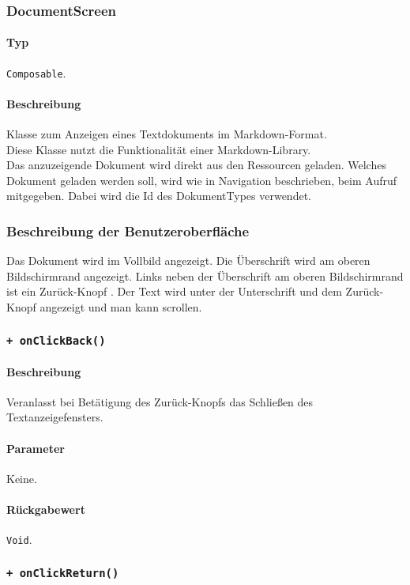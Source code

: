 \subsubsection{DocumentScreen}
\paragraph*{Typ}
\texttt{Composable}.
\paragraph*{Beschreibung}
Klasse zum Anzeigen eines Textdokuments im Markdown-Format.\\
Diese Klasse nutzt die Funktionalität einer Markdown-Library.\\
Das anzuzeigende Dokument wird direkt aus den Ressourcen geladen.
Welches Dokument geladen werden soll, wird wie in Navigation beschrieben, beim Aufruf mitgegeben. 
Dabei wird die Id des DokumentTypes verwendet.

\subsubsection*{Beschreibung der Benutzeroberfläche}
Das Dokument wird im Vollbild angezeigt.
Die Überschrift wird am oberen Bildschirmrand angezeigt.
Links neben der Überschrift am oberen Bildschirmrand ist ein \dq Zurück-Knopf \dq{}.
Der Text wird unter der Unterschrift und dem \dq Zurück-Knopf \dq{} angezeigt und man kann scrollen.

\subsubsection*{\texttt{+ onClickBack()}}%
\paragraph*{Beschreibung}
Veranlasst bei Betätigung des \dq Zurück-Knopfs \dq{} das Schließen des Textanzeigefensters.
\paragraph*{Parameter}
Keine.
\paragraph*{Rückgabewert}
\texttt{Void}.

\subsubsection*{\texttt{+ onClickReturn()}}%
